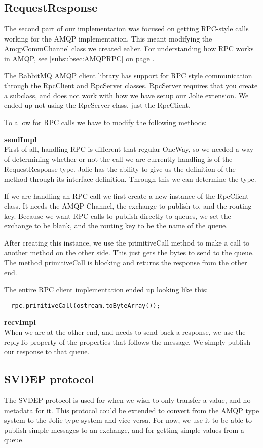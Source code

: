 \subsection{RequestResponse}
The second part of our implementation was focused on getting RPC-style calls working for the AMQP implementation. This meant modifying the AmqpCommChannel class we created ealier. For understanding how RPC works in AMQP, see \ref{subsubsec:AMQPRPC} on page \pageref{subsubsec:AMQPRPC}.

The RabbitMQ AMQP client library has support for RPC style communication through the RpcClient and RpcServer classes. RpcServer requires that you create a subclass, and does not work with how we have setup our Jolie extension. We ended up not using the RpcServer class, just the RpcClient.

To allow for RPC calls we have to modify the following methods:

\noindent\textbf{sendImpl}\\
First of all, handling RPC is different that regular OneWay, so we needed a way of determining whether or not the call we are currently handling is of the RequestResponse type. Jolie has the ability to give us the definition of the method through its interface definition. Through this we can determine the type.

If we are handling an RPC call we first create a new instance of the RpcClient class. It needs the AMQP Channel, the exchange to publish to, and the routing key. Because we want RPC calls to publish directly to queues, we set the exchange to be blank, and the routing key to be the name of the queue.

After creating this instance, we use the primitiveCall method to make a call to another method on the other side. This just gets the bytes to send to the queue. The method primitiveCall is blocking and returns the response from the other end.

The entire RPC client implementation ended up looking like this:
\begin{lstlisting}
  rpc.primitiveCall(ostream.toByteArray());
\end{lstlisting}

\noindent\textbf{recvImpl}\\
When we are at the other end, and needs to send back a response, we use the replyTo property of the properties that follows the message. We simply publish our response to that queue.


\subsection{SVDEP protocol}
\label{subsec:SVDEP} %
The SVDEP protocol is used for when we wish to only transfer a value, and no metadata for it. This protocol could be extended to convert from the AMQP type system to the Jolie type system and vice versa. For now, we use it to be able to publish simple messages to an exchange, and for getting simple values from a queue.

